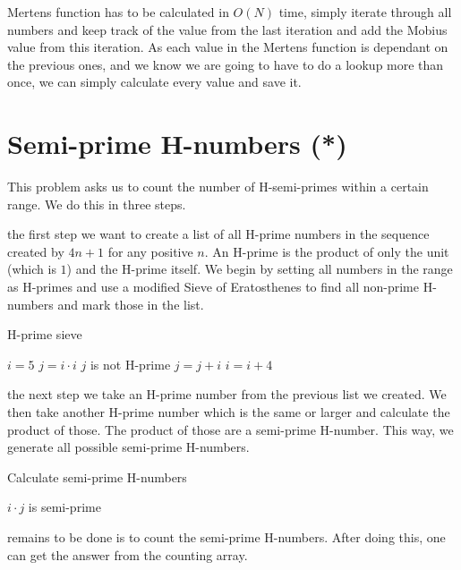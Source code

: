 \documentclass[11pt,a4paper,twoside]{article}
\begin{document}
 Mertens function has to be calculated in $O(N)$ time, simply
iterate through all numbers and keep track of the value from the last iteration
and add the Mobius value from this iteration. As each value in the Mertens
function is dependant on the previous ones, and we know we are going to have to
do a lookup more than once, we can simply calculate every value and save it.


\section{Semi-prime H-numbers (*)}

This problem asks us to count the number of H-semi-primes within a certain 
range. We do this in three steps.

 the first step we want to create a list of all H-prime numbers in
the sequence created by $4n + 1$ for any positive $n$. An H-prime is the
product of only the unit (which is $1$) and the H-prime itself. We begin by
setting all numbers in the range as H-primes and use a modified Sieve of
Eratosthenes to find all non-prime H-numbers and mark those in the list.

\begin{algorithm}
    \caption{H-prime sieve}
    \label{H-prime sieve}
    \begin{algorithmic}
        \STATE $i = 5$
                \STATE $j = i \cdot i$
                    \STATE $j$ is not H-prime %
                    \STATE $j = j + i$
                \ENDWHILE
            \ENDIF
            \STATE $i = i + 4$
        \ENDWHILE
    \end{algorithmic}
\end{algorithm}

 the next step we take an H-prime number from the previous list we
created. We then take another H-prime number which is the same or larger and
calculate the product of those. The product of those are a semi-prime H-number.
This way, we generate all possible semi-prime H-numbers.

\begin{algorithm}
    \caption{Calculate semi-prime H-numbers}
    \label{Semi-prime H-numbers}
    \begin{algorithmic}
                \STATE $i \cdot j$ is semi-prime
            \ENDFOR
        \ENDFOR
    \end{algorithmic}
\end{algorithm}

 remains to be done is to count the semi-prime H-numbers. After
doing this, one can get the answer from the counting array.

\end{document}
